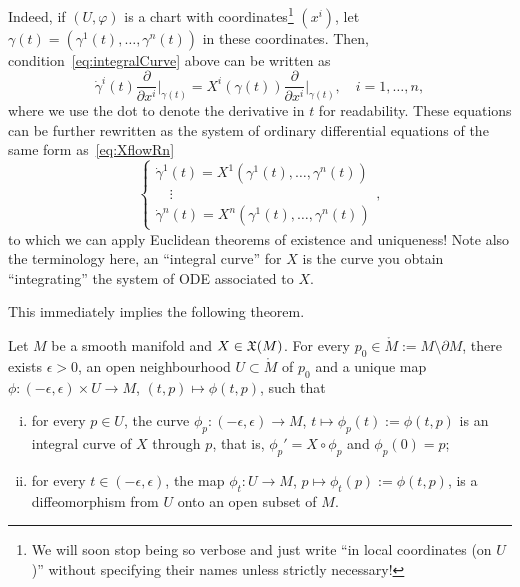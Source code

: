 Indeed, if $(U, \varphi)$ is a chart with coordinates\footnote{We will soon stop being so verbose and just write ``in local coordinates (on $U$)'' without specifying their names unless strictly necessary!} $(x^i)$, let $\gamma(t) = (\gamma^1(t), \ldots, \gamma^n(t))$ in these coordinates. Then, condition~\eqref{eq:integralCurve} above can be written as
\begin{equation}
	\dot\gamma^i(t)\frac{\partial}{\partial x^i}\Big|_{\gamma(t)}
	= X^i(\gamma(t))\frac{\partial}{\partial x^i}\Big|_{\gamma(t)},\quad i=1,\ldots,n,
\end{equation}
where we use the dot to denote the derivative in $t$ for readability.
These equations can be further rewritten as the system of ordinary differential equations of the same form as~\eqref{eq:XflowRn}
\begin{equation}
	\begin{cases}
		\dot\gamma^1(t) = X^1(\gamma^1(t), \ldots, \gamma^n(t)) \\
		\quad \vdots                                            \\
		\dot\gamma^n(t) = X^n(\gamma^1(t), \ldots, \gamma^n(t))
	\end{cases},
\end{equation}
to which we can apply Euclidean theorems of existence and uniqueness!
Note also the terminology here, an ``integral curve'' for $X$ is the curve you obtain ``integrating'' the system of ODE associated to $X$.

This immediately implies the following theorem.

\begin{theorem} %
	\label{thm:exuniqloc}
	Let $M$ be a smooth manifold and $X\in\mathfrak{X}(M)$. For every $p_0\in \mathring M := M\setminus \partial M$, there exists $\epsilon > 0$, an open neighbourhood $U\subset\mathring M$ of $p_0$ and a unique map $\phi : (-\epsilon, \epsilon) \times U \to M$, $(t, p) \mapsto \phi(t,p)$, such that
	\begin{enumerate}[(i)]
		\item for every $p\in U$, the curve $\phi_p : (-\epsilon, \epsilon) \to M$, $t\mapsto \phi_p(t) := \phi(t, p)$ is an integral curve of $X$ through $p$, that is, $\phi_p' = X\circ\phi_p$ and $\phi_p(0) = p$;
		\item for every $t\in(-\epsilon, \epsilon)$, the map $\phi_t: U \to M$, $p\mapsto \phi_t(p):=\phi(t,p)$, is a diffeomorphism from $U$ onto an open subset of $M$.
	\end{enumerate}
\end{theorem}

